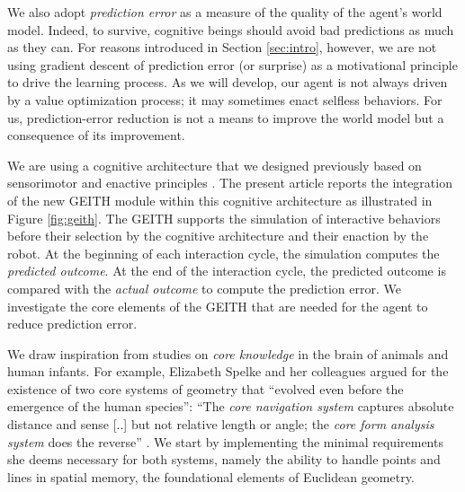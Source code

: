 \documentclass[runningheads]{llncs}
\begin{document}
We also adopt \textit{prediction error} as a measure of the quality of the agent's world model. %
Indeed, to survive, cognitive beings should avoid bad predictions as much as they can. %
For reasons introduced in Section \ref{sec:intro}, however, we are not using gradient descent of prediction error (or surprise) as a motivational principle to drive the learning process. 
As we will develop, our agent is not always driven by a value optimization process; it may sometimes enact selfless behaviors.
For us, prediction-error reduction is not a means to improve the world model but a consequence of its improvement.

We are using a cognitive architecture that we designed previously based on sensorimotor and enactive principles \cite{georgeon_artificial_2024}. 
The present article reports the integration of the new GEITH module within this cognitive architecture as illustrated in Figure \ref{fig:geith}. 
The GEITH supports the simulation of interactive behaviors before their selection by the cognitive architecture and their enaction by the robot. 
At the beginning of each interaction cycle, the simulation computes the \textit{predicted outcome}.
At the end of the interaction cycle, the predicted outcome is compared with the \textit{actual outcome} to compute the prediction error.   
We investigate the core elements of the GEITH that are needed for the agent to reduce prediction error. 

We draw inspiration from studies on \textit{core knowledge} in the brain of animals and human infants. 
For example, Elizabeth Spelke and her colleagues argued for the existence of two core systems of geometry that ``evolved even before the emergence of the human species'':  
``The \textit{core navigation system} captures absolute distance and sense [..] but not relative length or angle; the \textit{core form analysis system} does the reverse'' \cite[p. 2789]{spelke_core_2012}.
We start by implementing the minimal requirements she deems necessary for both systems, namely the ability to handle points and lines in spatial memory, the foundational elements of Euclidean geometry. 
\end{document}
